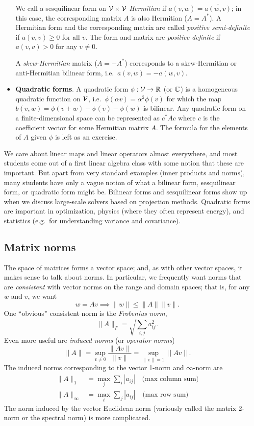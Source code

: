 \documentclass[12pt, leqno]{article} %
\begin{document}
\begin{itemize}
  We call a sesquilinear form on $\mathcal{V} \times \mathcal{V}$ {\em Hermitian} if
  $a(v,w) = \bar{a(w,v)}$; in this case, the corresponding matrix $A$ is
  also Hermitian ($A = A^*$).  A Hermitian form and the corresponding
  matrix are called {\em positive semi-definite} if $a(v,v) \geq 0$
  for all $v$.  The form and matrix are {\em positive definite} if
  $a(v,v) > 0$ for any $v \neq 0$.

  A {\em skew-Hermitian} matrix
  ($A = -A^*$) corresponds to a skew-Hermitian or anti-Hermitian bilinear
  form, i.e.~$a(v,w) = -a(w,v)$.
\item {\bf Quadratic forms}.  A quadratic form $\phi : \mathcal{V}
  \rightarrow \mathbb{R}$ (or $\mathbb{C}$) is a homogeneous quadratic function
  on $\mathcal{V}$, i.e.~$\phi(\alpha v) = \alpha^2 \phi(v)$ for which the
  map $b(v,w) = \phi(v+w) - \phi(v) - \phi(w)$ is bilinear.
  Any quadratic form on a finite-dimensional space can be
  represented as $c^* A c$ where $c$ is the coefficient vector for
  some Hermitian matrix $A$.  The formula for the elements of $A$
  given $\phi$ is left as an exercise.
\end{itemize}
We care about linear maps and linear operators almost everywhere, and
most students come out of a first linear algebra class with some
notion that these are important.  But apart from very standard
examples (inner products and norms), many students have only a vague
notion of what a bilinear form, sesquilinear form, or quadratic form
might be.  Bilinear forms and sesquilinear forms show up when we
discuss large-scale solvers based on projection methods.  Quadratic
forms are important in optimization, physics (where they often
represent energy), and statistics (e.g.~for understanding variance and
covariance).

\subsection{Matrix norms}

The space of matrices forms a vector space; and, as with other vector
spaces, it makes sense to talk about norms.  In particular, we
frequently want norms that are {\em consistent} with vector norms
on the range and domain spaces; that is, for any $w$ and $v$,
we want
\[
  w = Av \implies \|w\| \leq \|A\| \|v\|.
\]
One ``obvious'' consistent norm is the {\em Frobenius norm},
\[
  \|A\|_F = \sqrt{ \sum_{i,j} a_{ij}^2 }.
\]
Even more useful are {\em induced norms} (or {\em operator norms})
\[
  \|A\| = \sup_{v \neq 0} \frac{\|Av\|}{\|v\|} = \sup_{\|v\|=1} \|Av\|.
\]
The induced norms corresponding to the vector 1-norm and $\infty$-norm
are
\begin{align*}
  \|A\|_1 &= \max_j \sum_i |a_{ij}| \quad \mbox{(max column sum)}\\
  \|A\|_\infty &= \max_i \sum_j |a_{ij}| \quad \mbox{(max row sum)}
\end{align*}
The norm induced by the vector Euclidean norm (variously called
the matrix 2-norm or the spectral norm) is more complicated.
\end{document}
